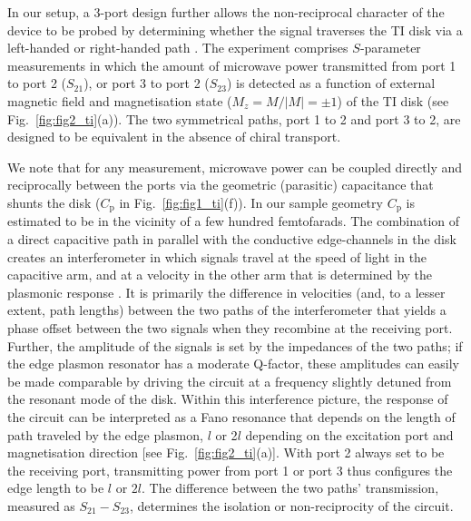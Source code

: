 In our setup, a 3-port design further allows the non-reciprocal character of the device to be probed by determining whether the signal traverses the TI disk via a left-handed or right-handed path \cite{viola2014hall, mahoney2016chip}. The experiment comprises $S$-parameter measurements in which the amount of microwave power transmitted from port 1 to port 2 ($S_{21}$), or port 3 to port 2 ($S_{23}$) is detected as a function of external magnetic field and magnetisation state ($M_z = M/\left| M\right|= \pm 1$) of the TI disk (see Fig.~\ref{fig:fig2_ti}(a)). The two symmetrical paths, port 1 to 2 and port 3 to 2, are designed to be equivalent in the absence of chiral transport.

We note that for any measurement, microwave power can be coupled directly and reciprocally between the ports via the geometric (parasitic) capacitance that shunts the disk ($C_\textrm{p}$ in Fig.~\ref{fig:fig1_ti}(f)). In our sample geometry $C_\textrm{p}$ is estimated to be in the vicinity of a few hundred femtofarads. The combination of a direct capacitive path in parallel with the conductive edge-channels in the disk creates an interferometer in which signals travel at the speed of light in the capacitive arm, and at a velocity in the other arm that is determined by the plasmonic response \cite{mahoney2016chip}. It is primarily the difference in velocities (and, to a lesser extent, path lengths)
between the two paths of the interferometer that yields a phase offset between the two signals when they recombine at the receiving port. Further, the amplitude of the signals is set by the impedances of the two paths; if the edge plasmon resonator has a moderate Q-factor, these amplitudes can easily be made comparable by driving the circuit at a frequency slightly detuned from the resonant mode of the disk. Within this interference picture, the response of the circuit can be interpreted as a Fano resonance that depends on the length of path traveled by the edge plasmon, $l$ or 2$l$ depending on the excitation port and magnetisation direction [see Fig.~\ref{fig:fig2_ti}(a)]. With port 2 always set to be the receiving port, transmitting power from port 1 or port 3 thus configures the edge length to be $l$ or $2l$. The difference between the two paths' transmission, measured as $S_{21} - S_{23}$, determines the isolation or non-reciprocity of the circuit. 
 
